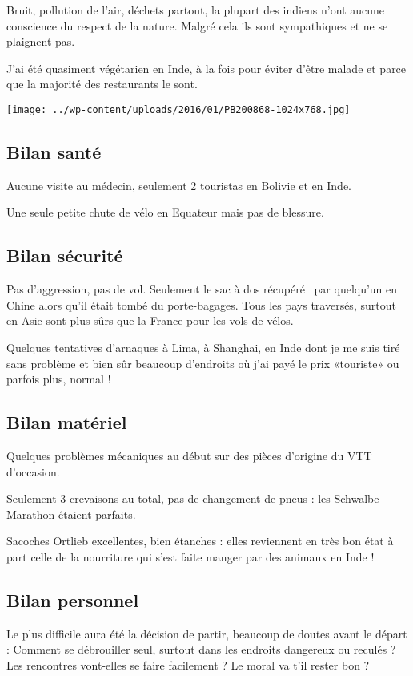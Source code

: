  Bruit, pollution de l'air, déchets partout, la plupart des indiens n'ont aucune conscience du respect de la nature. Malgré cela ils sont sympathiques et ne se plaignent pas. 

 J'ai été quasiment végétarien en Inde, à la fois pour éviter d'être malade et parce que la majorité des restaurants le sont.
\begin{center} \texttt{[image: ../wp-content/uploads/2016/01/PB200868-1024x768.jpg]} \end{center}
 
 \subsection*{Bilan santé}
 Aucune visite au médecin, seulement 2 touristas en Bolivie et en Inde.

 Une seule petite chute de vélo en Equateur mais pas de blessure.

 \subsection*{Bilan sécurité}
 Pas d'aggression, pas de vol. Seulement le sac à dos \og récupéré \fg\ par quelqu'un en Chine alors qu'il était tombé du porte-bagages. Tous les pays traversés, surtout en Asie sont plus sûrs que la France pour les vols de vélos. 

 Quelques tentatives d'arnaques à Lima, à Shanghai, en Inde dont je me suis tiré sans problème et bien sûr beaucoup d'endroits où j'ai payé le prix «touriste» ou parfois plus, normal !

 \subsection*{Bilan matériel}
 Quelques problèmes mécaniques au début sur des pièces d'origine du VTT d'occasion.

 Seulement 3 crevaisons au total, pas de changement de pneus : les Schwalbe Marathon étaient parfaits. 

 Sacoches Ortlieb excellentes, bien étanches : elles reviennent en très bon état à part celle de la nourriture qui s'est faite manger par des animaux en Inde !

 \subsection*{Bilan personnel} 

 Le plus difficile aura été la décision de partir, beaucoup de doutes avant le départ : Comment se débrouiller seul, surtout dans les endroits dangereux ou reculés ? Les rencontres vont-elles se faire facilement ? Le moral va t'il rester bon ?

